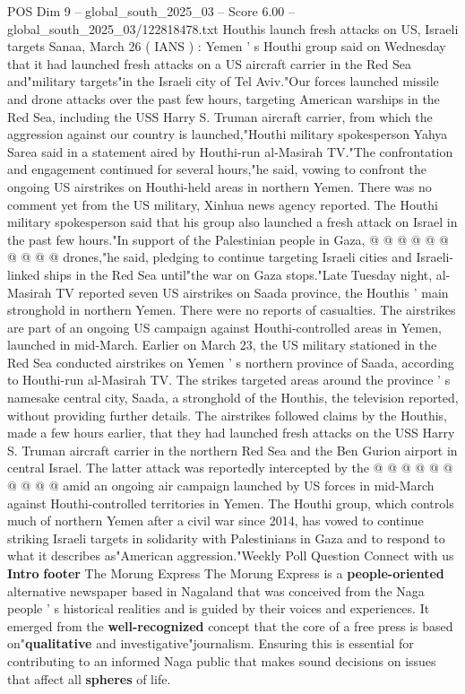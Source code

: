 \begin{textsample}{POS Dim 9 – global\_south\_2025\_03 – Score 6.00 – global\_south\_2025\_03/122818478.txt}  \label{ex:f9_pos_131}
Houthis launch fresh attacks on US, Israeli targets Sanaa, March 26 ( IANS ) : Yemen ' s Houthi group said on Wednesday that it had launched fresh attacks on a US aircraft carrier in the Red Sea and"military targets"in the Israeli city of Tel Aviv."Our forces launched missile and drone attacks over the past few hours, targeting American warships in the Red Sea, including the USS Harry S.
Truman aircraft carrier, from which the aggression against our country is launched,"Houthi military spokesperson Yahya Sarea said in a statement aired by Houthi-run al-Masirah TV."The confrontation and engagement continued for several hours,"he said, vowing to confront the ongoing US airstrikes on Houthi-held areas in northern Yemen.
There was no comment yet from the US military, Xinhua news agency reported.
The Houthi military spokesperson said that his group also launched a fresh attack on Israel in the past few hours."In support of the Palestinian people in Gaza, @ @ @ @ @ @ @ @ @ @ drones,"he said, pledging to continue targeting Israeli cities and Israeli-linked ships in the Red Sea until"the war on Gaza stops."Late Tuesday night, al-Masirah TV reported seven US airstrikes on Saada province, the Houthis ' main stronghold in northern Yemen.
There were no reports of casualties.
The airstrikes are part of an ongoing US campaign against Houthi-controlled areas in Yemen, launched in mid-March.
Earlier on March 23, the US military stationed in the Red Sea conducted airstrikes on Yemen ' s northern province of Saada, according to Houthi-run al-Masirah TV.
The strikes targeted areas around the province ' s namesake central city, Saada, a stronghold of the Houthis, the television reported, without providing further details.
The airstrikes followed claims by the Houthis, made a few hours earlier, that they had launched fresh attacks on the USS Harry S.
Truman aircraft carrier in the northern Red Sea and the Ben Gurion airport in central Israel.
The latter attack was reportedly intercepted by the @ @ @ @ @ @ @ @ @ @ amid an ongoing air campaign launched by US forces in mid-March against Houthi-controlled territories in Yemen.
The Houthi group, which controls much of northern Yemen after a civil war since 2014, has vowed to continue striking Israeli targets in solidarity with Palestinians in Gaza and to respond to what it describes as"American aggression."Weekly Poll Question Connect with us \textbf{Intro} \textbf{footer} The Morung Express The Morung Express is a \textbf{people-oriented} alternative newspaper based in Nagaland that was conceived from the Naga people ' s historical realities and is guided by their voices and experiences.
It emerged from the \textbf{well-recognized} concept that the core of a free press is based on"\textbf{qualitative} and investigative"journalism.
Ensuring this is essential for contributing to an informed Naga public that makes sound decisions on issues that affect all \textbf{spheres} of life.

\end{textsample}

